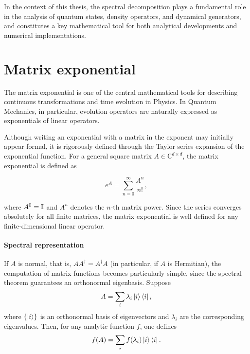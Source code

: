 In the context of this thesis, the spectral decomposition plays a fundamental role in the analysis of quantum states, density operators, and dynamical generators, and constitutes a key mathematical tool for both analytical developments and numerical implementations.

\section{Matrix exponential}
\label{sec:exp_matrix}

The matrix exponential is one of the central mathematical tools for describing continuous transformations and time evolution in Physics. In Quantum Mechanics, in particular, evolution operators are naturally expressed as exponentials of linear operators.

Although writing an exponential with a matrix in the exponent may initially appear formal, it is rigorously defined through the Taylor series expansion of the exponential function. For a general square matrix $A \in \mathbb{C}^{d \times d}$, the matrix exponential is defined as

\begin{equation}
    e^A = \sum_{n=0}^{\infty} \frac{A^n}{n!},
\end{equation}

where $A^0 = \mathbb{I}$ and $A^n$ denotes the $n$-th matrix power. Since the series converges absolutely for all finite matrices, the matrix exponential is well defined for any finite-dimensional linear operator.

\paragraph{Spectral representation}
If $A$ is normal, that is, $A A^\dagger = A^\dagger A$ (in particular, if $A$ is Hermitian), the computation of matrix functions becomes particularly simple, since the spectral theorem guarantees an orthonormal eigenbasis. Suppose
\begin{equation}
    A = \sum_i \lambda_i \ket{i}\bra{i},
\end{equation}
where $\{\ket{i}\}$ is an orthonormal basis of eigenvectors and $\lambda_i$ are the corresponding eigenvalues. Then, for any analytic function $f$, one defines
\begin{equation}
    f(A) = \sum_i f(\lambda_i)\ket{i}\bra{i}.
\end{equation}

